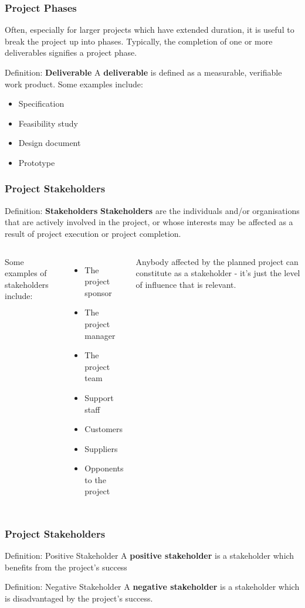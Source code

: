 \documentclass[aspectratio=169]{beamer}
\begin{document}
\begin{frame}
\frametitle{Project Phases}
Often, especially for larger projects which have extended duration, it is useful to break the project up into phases. Typically, the completion of one or more deliverables signifies a project phase.
\vspace{0.5cm}
\begin{block}{Definition: \textbf{Deliverable}}
A \textbf{deliverable} is defined as a measurable, verifiable work product. Some examples include:
\begin{itemize}
\item Specification
\item Feasibility study
\item Design document
\item Prototype
\end{itemize}
\end{block}
\end{frame}

\begin{frame}
\frametitle{Project Stakeholders}
\begin{block}{Definition: \textbf{Stakeholders}}
\textbf{Stakeholders} are the individuals and/or organisations that are actively involved in the project, or whose interests may be affected as a result of project execution or project completion.
\end{block}
\vspace{0.5cm}
\begin{columns}
Some examples of stakeholders include:
\begin{itemize}
\item The project sponsor
\item The project manager
\item The project team
\item Support staff
\item Customers
\item Suppliers
\item Opponents to the project
\end{itemize}
Anybody affected by the planned project can constitute as a stakeholder - it's just the level of influence that is relevant.
\end{columns}
\end{frame}

\begin{frame}
\frametitle{Project Stakeholders}
\begin{block}{Definition: Positive Stakeholder}
A \textbf{positive stakeholder} is a stakeholder which benefits from the project's success
\end{block}
\vspace{0.5cm}
\begin{block}{Definition: Negative Stakeholder}
A \textbf{negative stakeholder} is a stakeholder which is disadvantaged by the project's success.
\end{block}
\end{frame}
\end{document}
